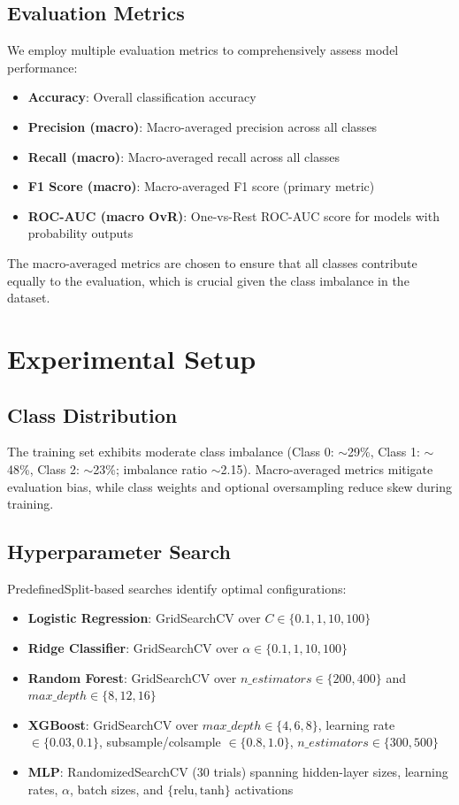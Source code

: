 \documentclass[12pt,a4paper]{article}
\begin{document}
\subsection{Evaluation Metrics}

We employ multiple evaluation metrics to comprehensively assess model performance:

\begin{itemize}
    \item \textbf{Accuracy}: Overall classification accuracy
    \item \textbf{Precision (macro)}: Macro-averaged precision across all classes
    \item \textbf{Recall (macro)}: Macro-averaged recall across all classes
    \item \textbf{F1 Score (macro)}: Macro-averaged F1 score (primary metric)
    \item \textbf{ROC-AUC (macro OvR)}: One-vs-Rest ROC-AUC score for models with probability outputs
\end{itemize}

The macro-averaged metrics are chosen to ensure that all classes contribute equally to the evaluation, which is crucial given the class imbalance in the dataset.

\section{Experimental Setup}

\subsection{Class Distribution}

The training set exhibits moderate class imbalance (Class 0: $\sim$29\%, Class 1: $\sim$48\%, Class 2: $\sim$23\%; imbalance ratio $\sim$2.15). Macro-averaged metrics mitigate evaluation bias, while class weights and optional oversampling reduce skew during training.

\subsection{Hyperparameter Search}

PredefinedSplit-based searches identify optimal configurations:
\begin{itemize}
    \item \textbf{Logistic Regression}: GridSearchCV over $C \in \{0.1, 1, 10, 100\}$
    \item \textbf{Ridge Classifier}: GridSearchCV over $\alpha \in \{0.1, 1, 10, 100\}$
    \item \textbf{Random Forest}: GridSearchCV over $n\_estimators \in \{200, 400\}$ and $max\_depth \in \{8, 12, 16\}$
    \item \textbf{XGBoost}: GridSearchCV over $max\_depth \in \{4, 6, 8\}$, learning rate $\in \{0.03, 0.1\}$, subsample/colsample $\in \{0.8, 1.0\}$, $n\_estimators \in \{300, 500\}$
    \item \textbf{MLP}: RandomizedSearchCV (30 trials) spanning hidden-layer sizes, learning rates, $\alpha$, batch sizes, and $\{\text{relu}, \text{tanh}\}$ activations
\end{itemize}
\end{document}
